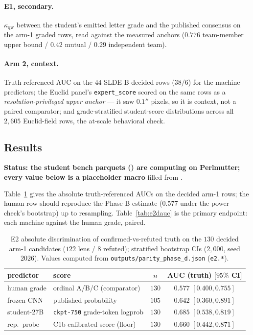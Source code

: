 \documentclass[11pt,letterpaper]{article}
\newcommand{\qwk}{\ensuremath{\kappa_{\mathrm{qw}}}}
\newcommand{\pdAucHuman}{$0.577$ $[0.400, 0.755]$}    %
\newcommand{\pdAucCnn}{$0.642$ $[0.360, 0.891]$}      %
\newcommand{\pdAucStudent}{$0.685$ $[0.538, 0.819]$}  %
\newcommand{\pdAucRep}{$0.660$ $[0.442, 0.871]$}      %
\newcommand{\pdNCnn}{$105$}              %
\newcommand{\pdNStudent}{$130$}          %
\newcommand{\pdNRep}{$130$}              %
\begin{document}
\paragraph{E1, secondary.} \qwk{} between the student's emitted letter grade and the
published consensus on the arm-1 graded rows, read against the measured anchors
($0.776$ team-member upper bound / $0.42$ mutual / $0.29$ independent team).

\paragraph{Arm 2, context.} Truth-referenced AUC on the $44$ SLDE-B-decided rows
($38/6$) for the machine predictors; the Euclid panel's \texttt{expert\_score} scored
on the same rows as a \emph{resolution-privileged upper anchor} --- it saw $0.1''$
pixels, so it is context, not a paired comparator; and grade-stratified student-score
distributions across all $2{,}605$ Euclid-field rows, the at-scale behavioral check.

\subsection{Results}\label{sec:dresults}
\textbf{Status: the student bench parquets
() are computing on Perlmutter; every value
below is a placeholder macro} filled from .

Table~\ref{tab:e2auc} gives the absolute truth-referenced AUCs on the decided arm-1
rows; the human row should reproduce the Phase B estimate ($0.577$ under the power
check's bootstrap) up to resampling. Table~\ref{tab:e2dauc} is the primary endpoint:
each machine against the human grade, paired.

\begin{table}[t]
\centering\small
\begin{tabular}{llcc}
\toprule
predictor & score & $n$ & AUC (truth) $[95\%$ CI$]$ \\
\midrule
human grade   & ordinal A/B/C (comparator)     & $130$        & \pdAucHuman \\
frozen CNN    & published probability          & \pdNCnn      & \pdAucCnn \\
student-27B   & \texttt{ckpt-750} grade-token logprob & \pdNStudent & \pdAucStudent \\
rep.\ probe   & C1b calibrated score (floor)   & \pdNRep      & \pdAucRep \\
\bottomrule
\end{tabular}
\caption{E2 absolute discrimination of confirmed-vs-refuted truth on the $130$ decided
arm-1 candidates ($122$ lens / $8$ refuted); stratified bootstrap CIs ($2{,}000$, seed
$2026$). Values computed from \texttt{outputs/parity\_phase\_d.json}
(\texttt{e2.*}).}\label{tab:e2auc}
\end{table}
\end{document}

